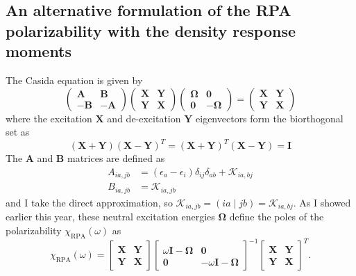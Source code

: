 \subsection{An alternative formulation of the RPA polarizability with the density response moments}
The Casida equation is given by
\begin{equation}
    \begin{pmatrix}
        \bm{A} & \bm{B} \\
        -\bm{B} & -\bm{A}
    \end{pmatrix}
    \begin{pmatrix}
        \bm{X} & \bm{Y} \\
        \bm{Y} & \bm{X}
    \end{pmatrix}
    \begin{pmatrix}
        \bm{\Omega} & \bm{0} \\
        \bm{0} & -\bm{\Omega}
    \end{pmatrix}
    = \begin{pmatrix}
        \bm{X} & \bm{Y} \\
        \bm{Y} & \bm{X}
    \end{pmatrix}
    \label{eqn:casida_eq}
\end{equation}
where the excitation $\bm{X}$ and de-excitation $\bm{Y}$ eigenvectors form the biorthogonal set as
\begin{equation}
    (\bm{X}+\bm{Y})(\bm{X}-\bm{Y})^T=(\bm{X}+\bm{Y})^T(\bm{X}-\bm{Y})=\bm{I}
    \label{eqn:biorthogonality}
\end{equation}
The $\bm{A}$ and $\bm{B}$ matrices are defined as
\begin{align}
    A_{i a, j b} &= \left(\epsilon_a-\epsilon_i\right) \delta_{i j} \delta_{a b}+\mathcal{K}_{i a, b j} \\
    B_{i a, j b} &= \mathcal{K}_{i a, j b}
\end{align}
and I take the direct approximation, so $\mathcal{K}_{i a, j b}=(i a \mid j b)=\mathcal{K}_{i a, b j}$. As I showed earlier this year, these neutral excitation energies $\bm{\Omega}$ define the poles of the polarizability $\chi_{\text{RPA}}(\omega)$ as
\begin{equation}
    \chi_{\text{RPA}}(\omega)=\left[\begin{array}{ll}
        \bm{X} & \bm{Y} \\
        \bm{Y} & \bm{X}
    \end{array}\right]\left[\begin{array}{cc}
        \omega \bm{I}-\bm{\Omega} & \bm{0} \\
        \bm{0} & -\omega \bm{I}-\bm{\Omega}
    \end{array}\right]^{-1}\left[\begin{array}{ll}
        \bm{X} & \bm{Y} \\
        \bm{Y} & \bm{X}
    \end{array}\right]^T.
    \label{eqn:chi_rpa}
\end{equation}
